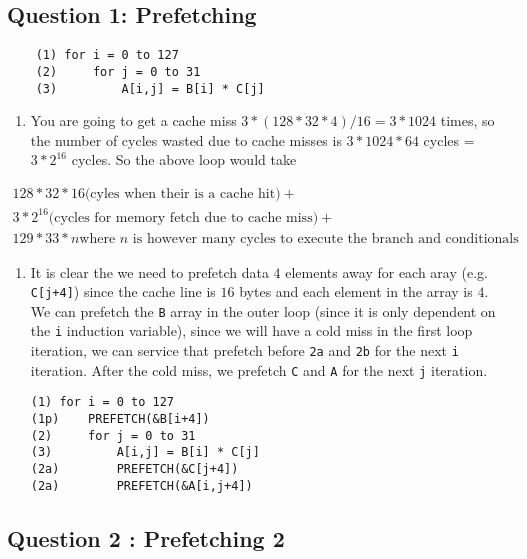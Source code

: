 \subsection{Question 1: Prefetching}\label{question-1-prefetching}

\begin{verbatim}
    (1) for i = 0 to 127 
    (2)     for j = 0 to 31 
    (3)         A[i,j] = B[i] * C[j] 
\end{verbatim}

\begin{enumerate}
\def\labelenumi{\alph{enumi}.}
\itemsep1pt\parskip0pt
\item
  You are going to get a cache miss $3*(128*32*4)/16 = 3*1024$ times, so
  the number of cycles wasted due to cache misses is $3*1024 * 64$
  cycles = $3*2^16$ cycles. So the above loop would take
\end{enumerate}

\begin{gather*}
128*32*16 \text{(cyles when their is a cache hit)} +\\
      3*2^16 \text{(cycles for memory fetch due to cache miss)} +\\
      129*33*n \text{where $n$ is however many cycles to execute the branch and conditionals}
\end{gather*}

\begin{enumerate}
\def\labelenumi{\alph{enumi}.}
\setcounter{enumi}{1}
\item
  It is clear the we need to prefetch data $4$ elements away for each
  aray (e.g. \texttt{C{[}j+4{]}}) since the cache line is $16$ bytes and
  each element in the array is $4$. We can prefetch the \texttt{B} array
  in the outer loop (since it is only dependent on the \texttt{i}
  induction variable), since we will have a cold miss in the first loop
  iteration, we can service that prefetch before \texttt{2a} and
  \texttt{2b} for the next \texttt{i} iteration. After the cold miss, we
  prefetch \texttt{C} and \texttt{A} for the next \texttt{j} iteration.

\begin{verbatim}
(1) for i = 0 to 127 
(1p)    PREFETCH(&B[i+4])
(2)     for j = 0 to 31
(3)         A[i,j] = B[i] * C[j] 
(2a)        PREFETCH(&C[j+4])
(2a)        PREFETCH(&A[i,j+4])
\end{verbatim}
\end{enumerate}

\subsection{Question 2 : Prefetching 2}\label{question-2-prefetching-2}

